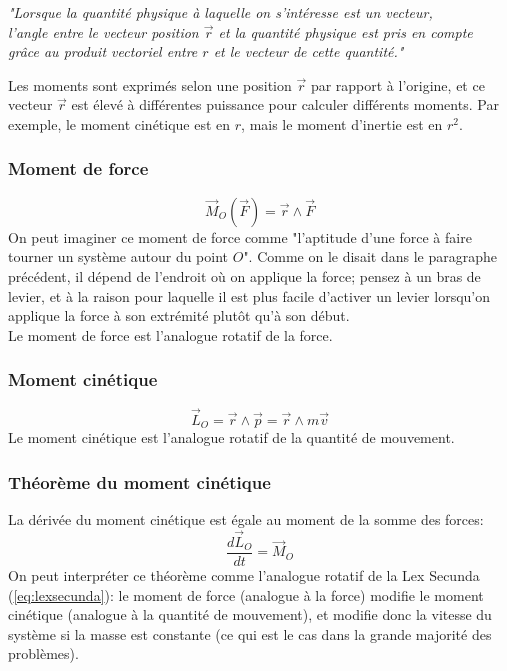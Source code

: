 \documentclass{article}
\numberwithin{equation}{section}
\begin{document}
\begin{center}
	\emph{"Lorsque la quantité physique à laquelle on s'intéresse est un vecteur, \\ l'angle entre le vecteur position \(\vec r\) et la quantité physique est pris en compte \\ grâce au produit vectoriel entre \(r\) et le vecteur de cette quantité."}
\end{center}

Les moments sont exprimés selon une position \(\vec r\) par rapport à l'origine, et ce vecteur \(\vec r\) est élevé à différentes puissance pour calculer différents moments. Par exemple, le moment cinétique est en \(r\), mais le moment d'inertie est en \(r^2\).

\subsubsection{Moment de force}
\begin{equation}
	\boxed{ \vec M_O ( \vec F ) = \vec r \wedge \vec F }
\end{equation}
On peut imaginer ce moment de force comme "l'aptitude d'une force à faire tourner un système autour du point \(O\)". Comme on le disait dans le paragraphe précédent, il dépend de l'endroit où on applique la force; pensez à un bras de levier, et à la raison pour laquelle il est plus facile d'activer un levier lorsqu'on applique la force à son extrémité plutôt qu'à son début. \\

Le moment de force est l'analogue rotatif de la force.

\subsubsection{Moment cinétique}
\begin{equation}
	\boxed{ \vec L_O = \vec r \wedge \vec p = \vec r \wedge m \vec v }
\end{equation}
Le moment cinétique est l'analogue rotatif de la quantité de mouvement.

\subsubsection{Théorème du moment cinétique}
La dérivée du moment cinétique est égale au moment de la somme des forces:
\begin{equation} \label{eq:thmmomentcinetique}
	\boxed{ \frac{d \vec L_O }{dt} = \vec M_O }
\end{equation}
On peut interpréter ce théorème comme l'analogue rotatif de la Lex Secunda (\ref{eq:lexsecunda}): le moment de force (analogue à la force) modifie le moment cinétique (analogue à la quantité de mouvement), et modifie donc la vitesse du système si la masse est constante (ce qui est le cas dans la grande majorité des problèmes).
\end{document}
